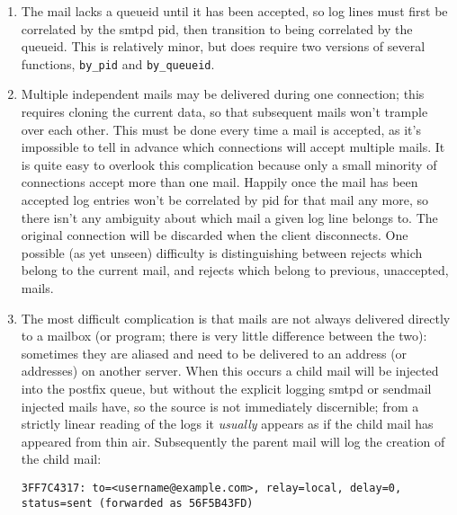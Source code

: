 \documentclass[a4paper,12pt,draft]{article}
\begin{document}
\begin{enumerate}

    \item The mail lacks a queueid until it has been accepted, so log lines
        must first be correlated by the smtpd pid, then transition to being
        correlated by the queueid.  This is relatively minor, but does
        require two versions of several functions, \texttt{by\_pid} and
        \texttt{by\_queueid}.

    \item Multiple independent mails may be delivered during one
        connection; this requires cloning the current data, so that
        subsequent mails won't trample over each other.  This must be done
        every time a mail is accepted, as it's impossible to tell in
        advance which connections will accept multiple mails.  It is quite
        easy to overlook this complication because only a small minority of
        connections accept more than one mail. Happily once the mail has
        been accepted log entries won't be correlated by pid for that mail
        any more, so there isn't any ambiguity about which mail a given log
        line belongs to.  The original connection will be discarded when
        the client disconnects.  One possible (as yet unseen) difficulty is
        distinguishing between rejects which belong to the current mail,
        and rejects which belong to previous, unaccepted, mails.

    \item The most difficult complication is that mails are not always
        delivered directly to a mailbox (or program; there is very little
        difference between the two): sometimes they are aliased and
        need to be delivered to an address (or addresses) on another
        server.  When this occurs a child mail will be injected into the
        postfix queue, but without the explicit logging smtpd or sendmail
        injected mails have, so the source is not immediately discernible;
        from a strictly linear reading of the logs it \textit{usually}
        appears as if the child mail has appeared from thin air.
        Subsequently the parent mail will log the creation of the child
        mail:

        \texttt{3FF7C4317: to=<username@example.com>, relay=local, \newline 
        delay=0, status=sent (forwarded as 56F5B43FD)}


\end{enumerate}
\end{document}
